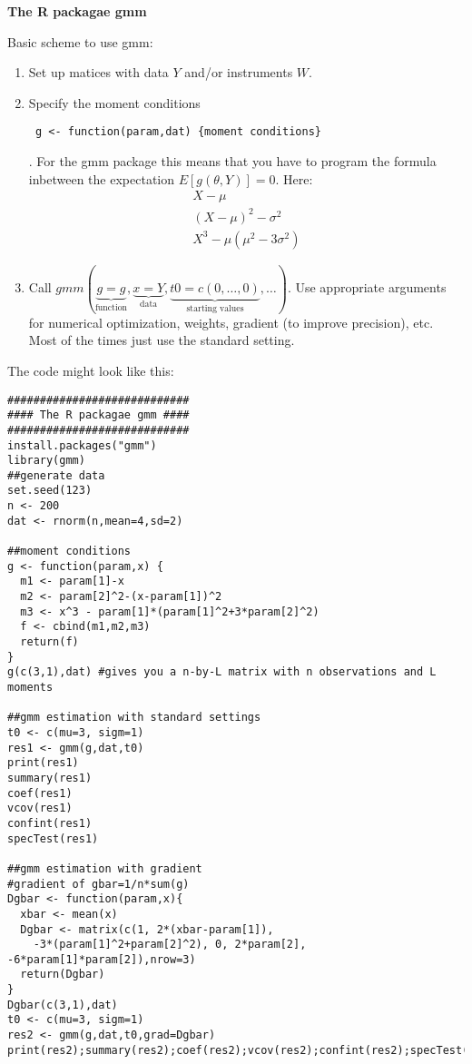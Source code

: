 \documentclass{article}
\begin{document}
\begin{solution}
\textbf{The R packagae gmm}

Basic scheme to use gmm:
\begin{enumerate}
  \item Set up matices with data $Y$ and/or instruments $W$.
  \item Specify the moment conditions
  \begin{verbatim} g <- function(param,dat) {moment conditions} \end{verbatim}.
  For the gmm package this means that you have to program the formula
      inbetween the expectation $E[g(\theta,Y)]=0$. Here: \begin{align*}
      X-\mu\\
      (X-\mu)^2 - \sigma^2\\
      X^3-\mu(\mu^2-3\sigma^2)
      \end{align*}
  \item Call
      $gmm(\underbrace{g=g}_\text{function},\underbrace{x=Y}_\text{data},\underbrace{t0=c(0,\dots,0)}_{\text{starting
      values}},\dots)$. Use appropriate arguments for numerical
      optimization, weights, gradient (to improve precision), etc. Most
      of the times just use the standard setting.
\end{enumerate}

The code might look like this:
\begin{verbatim}
############################
#### The R packagae gmm ####
############################
install.packages("gmm")
library(gmm)
##generate data
set.seed(123)
n <- 200
dat <- rnorm(n,mean=4,sd=2)

##moment conditions
g <- function(param,x) {
  m1 <- param[1]-x
  m2 <- param[2]^2-(x-param[1])^2
  m3 <- x^3 - param[1]*(param[1]^2+3*param[2]^2)
  f <- cbind(m1,m2,m3)
  return(f)
}
g(c(3,1),dat) #gives you a n-by-L matrix with n observations and L moments

##gmm estimation with standard settings
t0 <- c(mu=3, sigm=1)
res1 <- gmm(g,dat,t0)
print(res1)
summary(res1)
coef(res1)
vcov(res1)
confint(res1)
specTest(res1)

##gmm estimation with gradient
#gradient of gbar=1/n*sum(g)
Dgbar <- function(param,x){
  xbar <- mean(x)
  Dgbar <- matrix(c(1, 2*(xbar-param[1]),
    -3*(param[1]^2+param[2]^2), 0, 2*param[2], -6*param[1]*param[2]),nrow=3)
  return(Dgbar)
}
Dgbar(c(3,1),dat)
t0 <- c(mu=3, sigm=1)
res2 <- gmm(g,dat,t0,grad=Dgbar)
print(res2);summary(res2);coef(res2);vcov(res2);confint(res2);specTest(res2)


\end{verbatim}
\end{solution}
\end{document}
